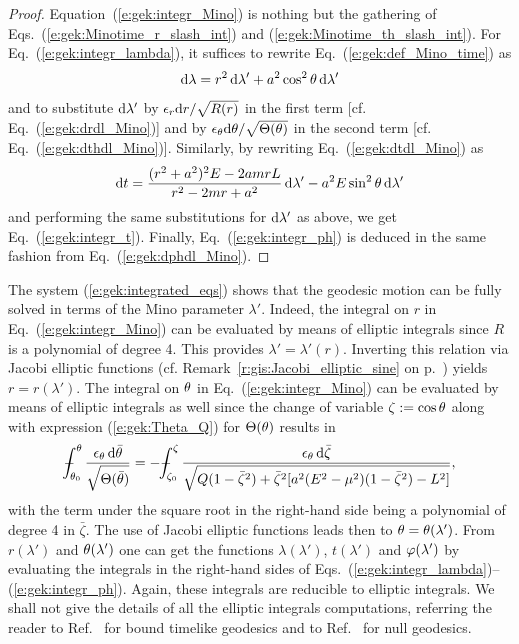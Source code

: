 \begin{proof}
Equation~(\ref{e:gek:integr_Mino}) is nothing but the gathering of
Eqs.~(\ref{e:gek:Minotime_r_slash_int}) and (\ref{e:gek:Minotime_th_slash_int}).
For Eq.~(\ref{e:gek:integr_lambda}), it suffices to rewrite Eq.~(\ref{e:gek:def_Mino_time})
as
\[
    \mathrm{d}\lambda = r^2 \, \mathrm{d}\lambda' + a^2\cos^2\theta \, \mathrm{d}\lambda'
\]
and to substitute $\mathrm{d}\lambda'$ by $\epsilon_r \mathrm{d} r / \sqrt{R(r)}$
in the first term [cf. Eq.~(\ref{e:gek:drdl_Mino})] and by
$\epsilon_\theta \mathrm{d}\theta / \sqrt{\Theta(\theta)}$ in the second term [cf. Eq.~(\ref{e:gek:dthdl_Mino})].
Similarly, by rewriting Eq.~(\ref{e:gek:dtdl_Mino}) as
\[
    \mathrm{d} t = \frac{(r^2 + a^2)^2 E - 2 a m r L}{r^2 - 2mr + a^2}  \, \mathrm{d}\lambda'
        - a^2 E \sin^2\theta  \, \mathrm{d}\lambda'
\]
and performing the same substitutions for $\mathrm{d}\lambda'$ as above, we get
Eq.~(\ref{e:gek:integr_t}). Finally, Eq.~(\ref{e:gek:integr_ph}) is deduced
in the same fashion from Eq.~(\ref{e:gek:dphdl_Mino}).
\end{proof}

The system (\ref{e:gek:integrated_eqs}) shows that the geodesic motion can be
fully solved in terms of the Mino parameter $\lambda'$. Indeed,
the integral on $r$ in Eq.~(\ref{e:gek:integr_Mino}) can be evaluated by
means of elliptic integrals since $R$ is a polynomial of degree 4. This provides
$\lambda' = \lambda'(r)$. Inverting this relation via Jacobi elliptic functions
(cf. Remark~\ref{r:gis:Jacobi_elliptic_sine} on p.~\pageref{r:gis:Jacobi_elliptic_sine})
yields $r = r(\lambda')$. The integral on $\theta$ in Eq.~(\ref{e:gek:integr_Mino})
can be evaluated by means of elliptic integrals as well since the change of variable
$\zeta := \cos\theta$ along with expression (\ref{e:gek:Theta_Q}) for $\Theta(\theta)$ results in
\[
\dashint_{\th_0}^\th \frac{\eps_\th \, \D \bar{\th}}{\sqrt{\Theta(\bar{\th})}}
= - \dashint_{\zeta_0}^\zeta
\frac{\eps_\th \, \D \bar{\zeta}}{\sqrt{Q(1-\bar{\zeta}^2) + \bar{\zeta}^2[a^2(E^2-\mu^2)(1-\bar{\zeta}^2) - L^2]}} ,
\]
with the term under the square root in the right-hand side being a polynomial of degree 4
in $\bar{\zeta}$.
The use of Jacobi elliptic functions leads then to $\theta = \theta(\lambda')$.
From $r(\lambda')$ and $\theta(\lambda')$ one can get the functions $\lambda(\lambda')$,
$t(\lambda')$ and $\varphi(\lambda')$
by evaluating the integrals in the right-hand sides of
Eqs.~(\ref{e:gek:integr_lambda})--(\ref{e:gek:integr_ph}). Again, these integrals are
reducible to elliptic integrals. We shall not give the details of all the
elliptic integrals computations, referring the reader to Ref.~\cite{FujitH09}
for bound timelike geodesics and to Ref.~\cite{GrallL20b} for null geodesics.

